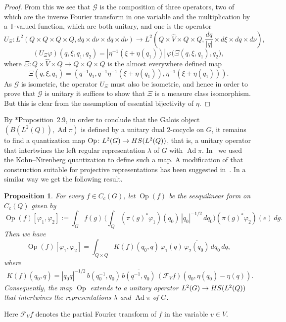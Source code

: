 \documentclass[a4paper,11pt,reqno]{amsart}
\numberwithin{equation}{section}
\newtheorem{proposition}[theorem]{Proposition}
\theoremstyle{remark}
\theoremstyle{definition}
\newcommand\Ad{\operatorname{Ad}}
\newcommand\Op{\operatorname{Op}}
\newcommand\HS{{\rm HS}}
\newcommand\T{{\mathbb T}}
\newcommand{\G}{\mathcal{G}}
\newcommand{\vf}{\varphi}
\newcommand{\CF}{\mathcal F}
\begin{document}
\begin{proof}
From this we see that $\G$ is the composition of three operators, two of which are the inverse Fourier transform in one variable and the multiplication by a $\T$-valued function, which are both unitary, and one is the operator
$$
U_\Xi\colon L^2(Q\times Q\times Q\times Q, dq\times d\nu\times dq\times d\nu)\to L^2(Q\times\hat V\times Q\times Q,\frac{dq}{|q|}\times d\xi\times dq\times d\nu),
$$
$$
(U_\Xi\vf)(q,\xi,q_1,q_2)=|\eta^{-1}(\xi+\eta(q_1))|\,\vf\big(\Xi(q,\xi,q_1),q_2\big),
$$
where $\Xi\colon Q\times\hat V\times Q\to Q\times Q\times Q$ is the almost everywhere defined map
$$
\Xi(q,\xi,q_1)=(q^{-1}q_1,q^{-1}\eta^{-1}(\xi+\eta(q_1)),\eta^{-1}(\xi+\eta(q_1))).
$$
As $\G$ is isometric, the operator $U_\Xi$ must also be isometric, and hence in order to prove that $\G$ is unitary it suffices to show that $\Xi$ is a measure class isomorphism. But this is clear from the assumption of essential bijectivity of $\eta$.
\end{proof}

By \cite{BGNT3}*{Proposition~2.9}, in order to conclude that the Galois object $(B(L^2(Q)),\Ad\pi)$ is defined by a unitary dual $2$-cocycle on $G$, it remains to find a quantization map $\Op\colon L^2(G)\to \HS(L^2(Q))$, that is, a unitary operator that intertwines the left regular representation $\lambda$ of $G$ with $\Ad\pi$. In~\cite{BGNT3} we used the Kohn--Nirenberg quantization to define such a map. A modification of that construction suitable for projective representations has been suggested in~\cite{GM}. In a similar way we get the following result.

\begin{proposition}
\label{UEQ}
For every $f\in C_c(G)$, let $\Op(f)$ be the sesquilinear form on $C_c(Q)$ given by
 $$
\Op(f)[\vf_1 ,\vf_2 ]:= \int_{G} f(g)\, \bigg(\int_Q(\pi(g)^*\vf_1) (q_0) \,|q_0|^{-1/2}\,dq_0\bigg)\overline{( \pi(g)^*\vf_2 )(e)}
\, dg.
$$
Then we have
$$
\Op(f)[\vf_1 ,\vf_2 ]=\int_{Q\times Q}K(f)(q_0,q)\,\vf_1 (q)\,\overline{\vf_2 (q_0)}\,
dq_0\,  dq,
$$
where
\begin{align}
 \label{Komega}
 K(f)(q_0,q)=|q_0q|^{-1/2}\,b (q^{-1}_0,q_0)\,\overline{b (q^{-1},q_0)}\,(\CF_V f)(q_0, \eta(q_0)-\eta(q)).
\end{align}
Consequently, the map $\Op$ extends to a unitary operator $L^2(G)\to{\HS}(L^2(Q))$ that intertwines the representations $\lambda$ and $\Ad\pi$ of $G$.
\end{proposition}

Here $\CF_Vf$ denotes the partial Fourier transform of $f$ in the variable $v\in V$.
\end{document}
